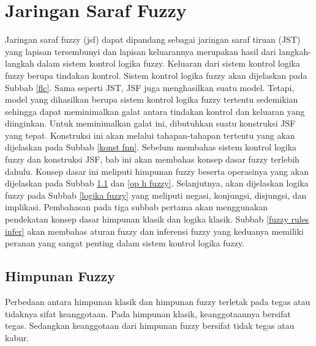 \vspace{15cm}
\chapter{Jaringan Saraf Fuzzy} \label{bab jsf}

\noindent Jaringan saraf fuzzy (\gls{jsf}) dapat dipandang sebagai jaringan saraf tiruan (JST) yang lapisan tersembunyi dan lapisan keluarannya merupakan hasil dari langkah-langkah dalam sistem kontrol logika fuzzy. Keluaran dari sistem kontrol logika fuzzy berupa tindakan kontrol. Sistem kontrol logika fuzzy akan dijelaskan pada Subbab \ref{flc}. Sama seperti JST, JSF juga menghasilkan suatu model. Tetapi, model yang dihasilkan berupa sistem kontrol logika fuzzy tertentu sedemikian sehingga dapat meminimalkan galat antara tindakan kontrol dan keluaran yang diinginkan. Untuk meminimalkan galat ini, dibutuhkan suatu konstruksi JSF yang tepat. Konstruksi ini akan melalui tahapan-tahapan tertentu yang akan dijelaskan pada Subbab \ref{konst fnn}. Sebelum membahas sistem kontrol logika fuzzy dan konstruksi JSF, bab ini akan membahas konsep dasar fuzzy terlebih dahulu. Konsep dasar ini meliputi himpunan fuzzy beserta operasinya yang akan dijelaskan pada Subbab \ref{himpunan fuzzy} dan \ref{op h fuzzy}. Selanjutnya, akan dijelaskan logika fuzzy pada Subbab \ref{logika fuzzy} yang meliputi negasi, konjungsi, disjungsi, dan implikasi. Pembahasan pada tiga subbab pertama akan menggunakan pendekatan konsep dasar himpunan klasik dan logika klasik. Subbab \ref{fuzzy rules infer} akan membahas aturan fuzzy dan inferensi fuzzy yang keduanya memiliki peranan yang sangat penting dalam sistem kontrol logika fuzzy.

\section{Himpunan Fuzzy} \label{himpunan fuzzy}
\noindent Perbedaan antara himpunan klasik dan himpunan fuzzy terletak pada tegas atau tidaknya sifat keanggotaan. Pada himpunan klasik, keanggotaannya bersifat tegas. Sedangkan keanggotaan dari himpunan fuzzy bersifat tidak tegas atau kabur.

